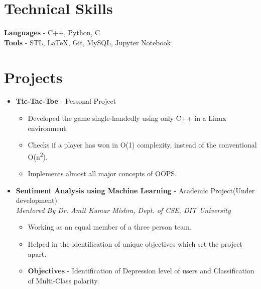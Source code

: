 \documentclass[a4paper, margin, centered]{res}
\begin{document}
\begin{resume}
 

\section{Technical \hspace{2mm} Skills}
\textbf{Languages} - C++, Python, C\\
\textbf{Tools} - STL, \LaTeX, Git, MySQL, Jupyter Notebook

\section{Projects}
\begin{itemize}[leftmargin=*]
  
  \item \textbf{Tic-Tac-Toe} - Personal Project 
  	\begin{itemize}[leftmargin=*]
		\item Developed the game single-handedly using only C++ in a Linux environment.
		\item Checks if a player has won in O(1) complexity, instead of the conventional O(n\textsuperscript{2}).
		\item Implements almost all major concepts of OOPS.	
	\end{itemize}
	\vspace{1mm}
	\item \textbf{Sentiment Analysis using Machine Learning} - Academic Project(Under development) \hfill \\
  \textit{Mentored By Dr. Amit Kumar Mishra, Dept. of CSE, DIT University}
	\begin{itemize}[leftmargin=*]
			\item Working as an equal member of a three person team. 
			\item Helped in the identification of unique objectives which set the project apart.
			\item \textbf{Objectives} - Identification of Depression level of users and Classification of Multi-Class polarity.
	\end{itemize}


\end{itemize}
\end{resume}
\end{document}
